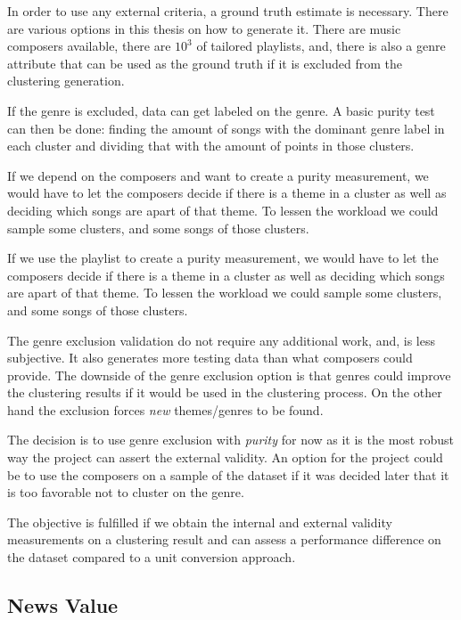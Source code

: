 \documentclass[a4paper,11pt]{article}
\begin{document}
In order to use any external criteria, a ground truth estimate is necessary. There are various options in this thesis on how to generate it. There are music composers available, there are $10^3$ of tailored playlists, and, there is also a genre attribute that can be used as the ground truth if it is excluded from the clustering generation.

If the genre is excluded, data can get labeled on the genre. A basic purity test can then be done: finding the amount of songs with the dominant genre label in each cluster and dividing that with the amount of points in those clusters.

If we depend on the composers and want to create a purity measurement, we would have to let the composers decide if there is a theme in a cluster as well as deciding which songs are apart of that theme. To lessen the workload we could sample some clusters, and some songs of those clusters.

If we use the playlist to create a purity measurement, we would have to let the composers decide if there is a theme in a cluster as well as deciding which songs are apart of that theme. To lessen the workload we could sample some clusters, and some songs of those clusters.

The genre exclusion validation do not require any additional work, and, is less subjective. It also generates more testing data than what composers could provide. The downside of the genre exclusion option is that genres could improve the clustering results if it would be used in the clustering process. On the other hand the exclusion forces \textit{new} themes/genres to be found.

The decision is to use genre exclusion with \textit{purity} for now as it is the most robust way the project can assert the external validity. An option for the project could be to use the composers on a sample of the dataset if it was decided later that it is too favorable not to cluster on the genre.

The objective is fulfilled if we obtain the internal and external validity measurements on a clustering result and can assess a performance difference on the dataset compared to a unit conversion approach.


\subsection{News Value}
\end{document}
